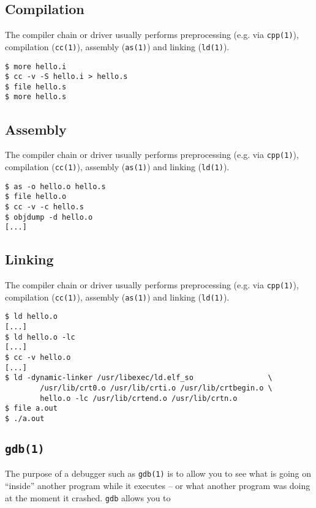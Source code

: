 \documentclass[xga]{xdvislides}
\begin{document}
\subsection{Compilation}

The compiler chain or driver usually performs
preprocessing (e.g. via {\tt cpp(1)}), compilation
({\tt cc(1)}), assembly ({\tt as(1)}) and linking
({\tt ld(1)}).

\begin{verbatim}
$ more hello.i
$ cc -v -S hello.i > hello.s
$ file hello.s
$ more hello.s
\end{verbatim}

\subsection{Assembly}

The compiler chain or driver usually performs
preprocessing (e.g. via {\tt cpp(1)}), compilation
({\tt cc(1)}), assembly ({\tt as(1)}) and linking
({\tt ld(1)}).

\begin{verbatim}
$ as -o hello.o hello.s
$ file hello.o
$ cc -v -c hello.s
$ objdump -d hello.o
[...]
\end{verbatim}

\subsection{Linking}

The compiler chain or driver usually performs
preprocessing (e.g. via {\tt cpp(1)}), compilation
({\tt cc(1)}), assembly ({\tt as(1)}) and linking
({\tt ld(1)}).

\begin{verbatim}
$ ld hello.o
[...]
$ ld hello.o -lc
[...]
$ cc -v hello.o
[...]
$ ld -dynamic-linker /usr/libexec/ld.elf_so                 \
        /usr/lib/crt0.o /usr/lib/crti.o /usr/lib/crtbegin.o \
        hello.o -lc /usr/lib/crtend.o /usr/lib/crtn.o
$ file a.out
$ ./a.out
\end{verbatim}

\subsection{{\tt gdb(1)}}

The purpose of a debugger such as {\tt gdb(1)} is to allow you to see what is
going on ``inside'' another program while it executes -- or what another
program was doing at the moment it crashed. {\tt gdb} allows you to
\end{document}
